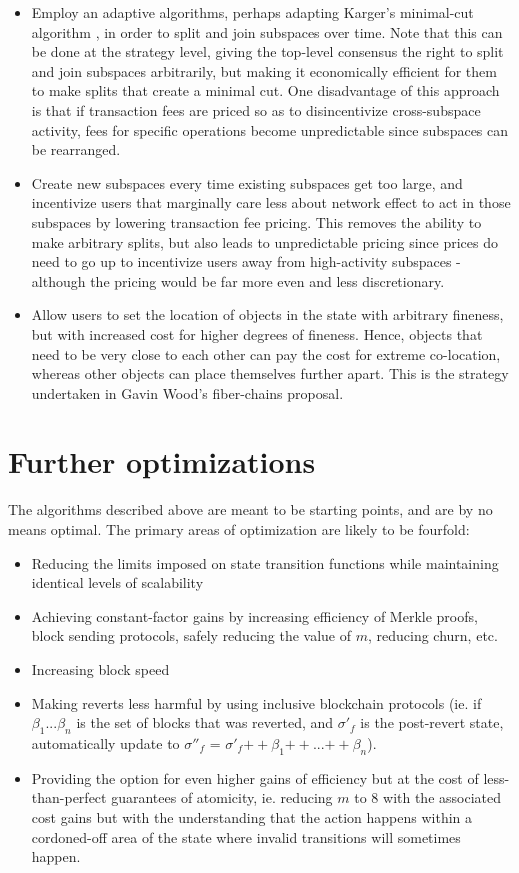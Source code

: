 \documentclass[11pt,a4paper]{article}
\theoremstyle{plain}
\theoremstyle{definition}
\theoremstyle{remark}
\begin{document}
\begin{itemize}
\item
Employ an adaptive algorithms, perhaps adapting Karger's minimal-cut algorithm \cite{karger}, in order to split and join subspaces over time. Note that this can be done at the strategy level, giving the top-level consensus the right to split and join subspaces arbitrarily, but making it economically efficient for them to make splits that create a minimal cut. One disadvantage of this approach is that if transaction fees are priced so as to disincentivize cross-subspace activity, fees for specific operations become unpredictable since subspaces can be rearranged.
\item
Create new subspaces every time existing subspaces get too large, and incentivize users that marginally care less about network effect to act in those subspaces by lowering transaction fee pricing. This removes the ability to make arbitrary splits, but also leads to unpredictable pricing since prices do need to go up to incentivize users away from high-activity subspaces - although the pricing would be far more even and less discretionary.
\item
Allow users to set the location of objects in the state with arbitrary fineness, but with increased cost for higher degrees of fineness. Hence, objects that need to be very close to each other can pay the cost for extreme co-location, whereas other objects can place themselves further apart. This is the strategy undertaken in Gavin Wood's fiber-chains proposal\cite{fiberchains}.
\end{itemize}

\section{Further optimizations}

The algorithms described above are meant to be starting points, and are by no means optimal. The primary areas of optimization are likely to be fourfold:

\begin{itemize}
\item
Reducing the limits imposed on state transition functions while maintaining identical levels of scalability
\item
Achieving constant-factor gains by increasing efficiency of Merkle proofs, block sending protocols, safely reducing the value of $m$, reducing churn, etc.
\item
Increasing block speed
\item
Making reverts less harmful by using inclusive blockchain protocols (ie. if $\beta_1 ... \beta_n$ is the set of blocks that was reverted, and $\sigma'_f$ is the post-revert state, automatically update to $\sigma''_f$ = $\sigma'_f {++} \beta_1 {++} ... {++} \beta_n$).
\item
Providing the option for even higher gains of efficiency but at the cost of less-than-perfect guarantees of atomicity, ie. reducing $m$ to $8$ with the associated cost gains but with the understanding that the action happens within a cordoned-off area of the state where invalid transitions will sometimes happen.
\end{itemize}
\end{document}
